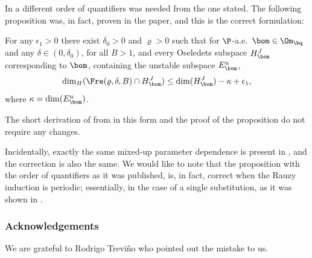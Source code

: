 In \cite[Prop.\,5.4]{BuSo21} a different order of quantifiers was needed from the one stated. The following proposition was, in fact, proven in the paper, and this is the correct formulation:

\begin{prop*}
For any $\epsilon_1>0$ there exist $\delta_0>0$ and $\varrho>0$ such that for $\P$\nobreakdash-a.e.\ $\bom\in\nobreak \Om_\bq$ and any $\delta\in (0,\delta_0)$, for all $B>1$, and every
Oseledets subspace $H_\bom^J$ corresponding to $\bom$, containing the unstable subspace $E^u_\bom$,
\[
\dim_H(\Fre(\varrho,\delta,B)\cap H_\bom^J) \le \dim(H_\bom^J) -\kappa + \epsilon_1,
\]
where $\kappa=\dim(E^u_\bom)$.
\end{prop*}

The short derivation of \cite[Th.\,4.1]{BuSo21} from \cite[Prop.\,5.4]{BuSo21} in this form and the proof of the proposition do not require any changes. 

Incidentally, exactly the same mixed-up parameter dependence is present in \hbox{\cite[Prop.\,9.1]{BuSo18a}}, and the correction is also the same.
We would like to note that the proposition with the order of quantifiers as it was published, is, in fact, correct when the Rauzy induction is periodic; essentially, in the case of a single substitution, as it was shown in \cite{BuSol2}.

\subsubsection*{Acknowledgements}
We are grateful to Rodrigo Trevi\~no who pointed out the mistake to us.
